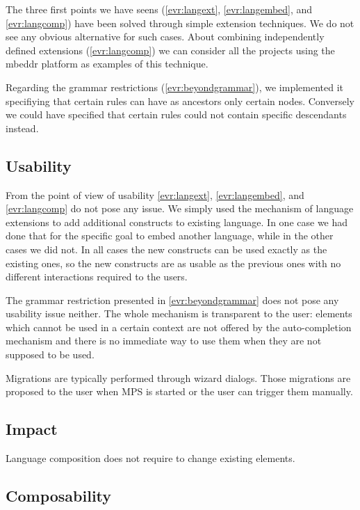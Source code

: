 \documentclass[preprint,numbers,10pt]{sigplanconf}
\begin{document}
The three first points we have seens (\ref{evr:langext}, \ref{evr:langembed}, and \ref{evr:langcomp}) have been solved through simple extension techniques. We do not see any obvious alternative for such cases. About combining independently defined extensions (\ref{evr:langcomp}) we can consider all the projects using the mbeddr platform as examples of this technique.

Regarding the grammar restrictions (\ref{evr:beyondgrammar}), we implemented it specifiying that certain rules can have as ancestors only certain nodes. Conversely we could have specified that certain rules could not contain specific descendants instead.

\subsection{Usability}

From the point of view of usability \ref{evr:langext}, \ref{evr:langembed}, and \ref{evr:langcomp} do not pose any issue. We simply used the mechanism of language extensions to add additional constructs to existing language. In one case we had done that for the specific goal to embed another language, while in the other cases we did not. In all cases the new constructs can be used exactly as the existing ones, so the new constructs are as usable as the previous ones with no different interactions required to the users.

The grammar restriction presented in \ref{evr:beyondgrammar} does not pose any usability issue neither. The whole mechanism is transparent to the user: elements which cannot be used in a certain context are not offered by the auto-completion mechanism and there is no immediate way to use them when they are not supposed to be used.

Migrations are typically performed through wizard dialogs. Those migrations are proposed to the user when MPS is started or the user can trigger them manually.

\subsection{Impact}

Language composition does not require to change existing elements.

\subsection{Composability}
\end{document}
